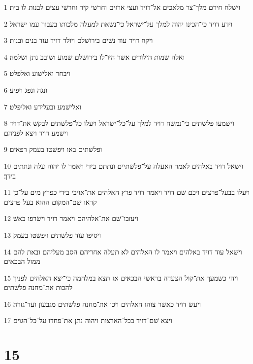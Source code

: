 \par 1 וישׁלח חירם מלך־צר מלאכים אל־דויד ועצי ארזים וחרשׁי קיר וחרשׁי עצים לבנות לו בית׃
\par 2 וידע דויד כי־הכינו יהוה למלך על־ישׂראל כי־נשׂאת למעלה מלכותו בעבור עמו ישׂראל׃
\par 3 ויקח דויד עוד נשׁים בירושׁלם ויולד דויד עוד בנים ובנות׃
\par 4 ואלה שׁמות הילודים אשׁר היו־לו בירושׁלם שׁמוע ושׁובב נתן ושׁלמה׃
\par 5 ויבחר ואלישׁוע ואלפלט׃
\par 6 ונגה ונפג ויפיע׃
\par 7 ואלישׁמע ובעלידע ואליפלט׃
\par 8 וישׁמעו פלשׁתים כי־נמשׁח דויד למלך על־כל־ישׂראל ויעלו כל־פלשׁתים לבקשׁ את־דויד וישׁמע דויד ויצא לפניהם׃
\par 9 ופלשׁתים באו ויפשׁטו בעמק רפאים׃
\par 10 וישׁאל דויד באלהים לאמר האעלה על־פלשׁתיים ונתתם בידי ויאמר לו יהוה עלה ונתתים בידך׃
\par 11 ויעלו בבעל־פרצים ויכם שׁם דויד ויאמר דויד פרץ האלהים את־אויבי בידי כפרץ מים על־כן קראו שׁם־המקום ההוא בעל פרצים׃
\par 12 ויעזבו־שׁם את־אלהיהם ויאמר דויד וישׂרפו באשׁ׃
\par 13 ויסיפו עוד פלשׁתים ויפשׁטו בעמק׃
\par 14 וישׁאל עוד דויד באלהים ויאמר לו האלהים לא תעלה אחריהם הסב מעליהם ובאת להם ממול הבכאים׃
\par 15 ויהי כשׁמעך את־קול הצעדה בראשׁי הבכאים אז תצא במלחמה כי־יצא האלהים לפניך להכות את־מחנה פלשׁתים׃
\par 16 ויעשׂ דויד כאשׁר צוהו האלהים ויכו את־מחנה פלשׁתים מגבעון ועד־גזרה׃
\par 17 ויצא שׁם־דויד בכל־הארצות ויהוה נתן את־פחדו על־כל־הגוים׃

\chapter{15}

